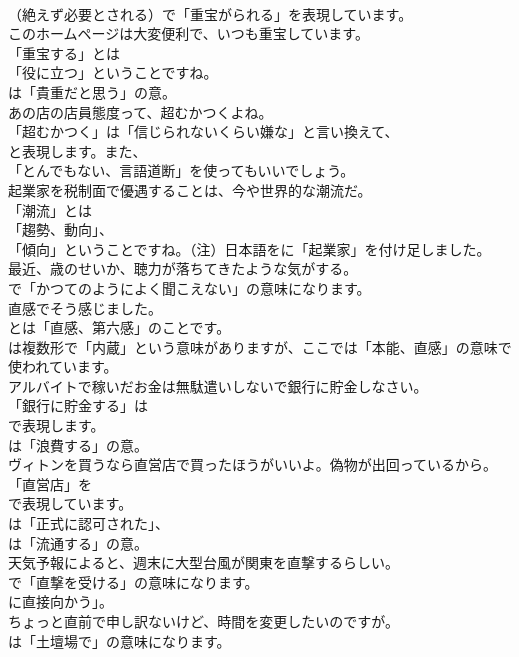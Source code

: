 \documentclass[8pt]{extreport}
\begin{document}
\begin{CJK}{UTF8}{min}
\\	（絶えず必要とされる）で「重宝がられる」を表現しています。	
\\	このホームページは大変便利で、いつも重宝しています。 
\\	「重宝する」とは
\\	「役に立つ」ということですね。
\\	は「貴重だと思う」の意。	
\\	あの店の店員態度って、超むかつくよね。 
\\	「超むかつく」は「信じられないくらい嫌な」と言い換えて、
\\	と表現します。また、
\\	「とんでもない、言語道断」を使ってもいいでしょう。	
\\	起業家を税制面で優遇することは、今や世界的な潮流だ。 
\\	「潮流」とは
\\	「趨勢、動向」、
\\	「傾向」ということですね。（注）日本語をに「起業家」を付け足しました。	
\\	最近、歳のせいか、聴力が落ちてきたような気がする。 
\\	で「かつてのようによく聞こえない」の意味になります。	
\\	直感でそう感じました。 
\\	とは「直感、第六感」のことです。
\\	は複数形で「内蔵」という意味がありますが、ここでは「本能、直感」の意味で使われています。	
\\	アルバイトで稼いだお金は無駄遣いしないで銀行に貯金しなさい。 
\\	「銀行に貯金する」は 
\\	で表現します。
\\	は「浪費する」の意。	
\\	ヴィトンを買うなら直営店で買ったほうがいいよ。偽物が出回っているから。 
\\	「直営店」を 
\\	で表現しています。
\\	は「正式に認可された」、
\\	は「流通する」の意。	
\\	天気予報によると、週末に大型台風が関東を直撃するらしい。 
\\	で「直撃を受ける」の意味になります。
\\	に直接向かう」。	
\\	ちょっと直前で申し訳ないけど、時間を変更したいのですが。 
\\	は「土壇場で」の意味になります。	

\end{CJK}
\end{document}

